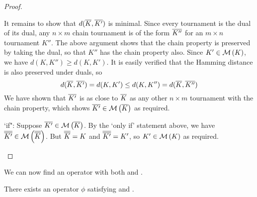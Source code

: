 \begin{proof}
\begin{itemize}
    It remains to show that $d({\overline{K}}, {\overline{K'}})$ is minimal. Since every
    tournament is the dual of its dual, any $n \times m$ chain tournament is of
    the form ${\overline{K''}}$ for an $m \times n$ tournament $K''$. The above
    argument shows that the chain property is preserved by taking the dual, so
    that $K''$ has the chain property also. Since $K' \in \operatorname{\mathcal{M}}\left({K}\right)$, we have
    $d(K, K'') \ge d(K, K')$. It is easily verified that the Hamming distance
    is also preserved under duals, so
    \[
        d({\overline{K}}, {\overline{K'}})
        = d(K, K')
        \le d(K, K'')
        = d({\overline{K}}, {\overline{K''}})
    \]
    We have shown that ${\overline{K'}}$ is as close to ${\overline{K}}$ as any other $n
    \times m$ tournament with the chain property, which shows ${\overline{K'}} \in
    \operatorname{\mathcal{M}}\left({{\overline{K}}}\right)$ as required.

    `if": Suppose ${\overline{K'}} \in \operatorname{\mathcal{M}}\left({{\overline{K}}}\right)$. By the `only if' statement
    above, we have ${\overline{{\overline{K'}}}} \in \operatorname{\mathcal{M}}\left({{\overline{{\overline{K}}}}}\right)$. But
    ${\overline{{\overline{K}}}} = K$ and ${\overline{{\overline{K'}}}} = K'$, so $K' \in \operatorname{\mathcal{M}}\left({K}\right)$ as
    required.
    \end{itemize}
\end{proof}

We can now find an operator with both  and .

\begin{proposition}
    \label{tourn_result_chainmin_dual_compatibility}
    There exists an operator $\phi$ satisfying  and
    .
\end{proposition}

